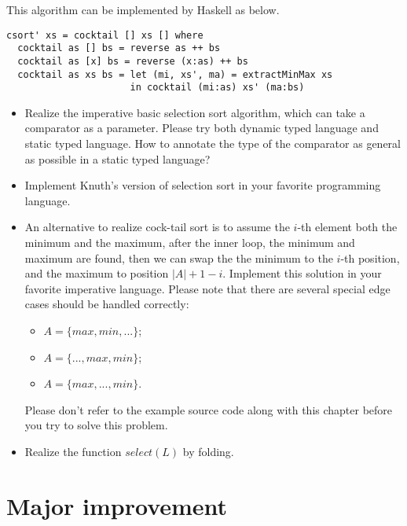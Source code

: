 \documentclass{article}
\begin{document}
This algorithm can be implemented by Haskell as below.

\lstset{language=Haskell}
\begin{lstlisting}
csort' xs = cocktail [] xs [] where
  cocktail as [] bs = reverse as ++ bs
  cocktail as [x] bs = reverse (x:as) ++ bs
  cocktail as xs bs = let (mi, xs', ma) = extractMinMax xs
                      in cocktail (mi:as) xs' (ma:bs)
\end{lstlisting}

\begin{Exercise}
  \begin{itemize}
    \item Realize the imperative basic selection sort algorithm, which can take a comparator as a parameter. Please try both dynamic typed language and static typed language. How to annotate the type of the comparator as general as possible in a static typed language?
   \item Implement Knuth's version of selection sort in your favorite programming language.
   \item An alternative to realize cock-tail sort is to assume the $i$-th element both the minimum and the maximum, after the inner loop, the minimum and maximum are found, then we can swap the the minimum to the $i$-th position, and
the maximum to position $|A|+1-i$. Implement this solution in your favorite imperative language. Please note that
there are several special edge cases should be handled correctly:
    \begin{itemize}
      \item $A = \{max, min, ...\}$;
      \item $A = \{..., max, min\}$;
      \item $A = \{max, ..., min\}$.
    \end{itemize}
    Please don't refer to the example source code along with this chapter before you try to solve this problem.
    \item Realize the function $select(L)$ by folding.
  \end{itemize}
\end{Exercise}


\section{Major improvement}
\end{document}

